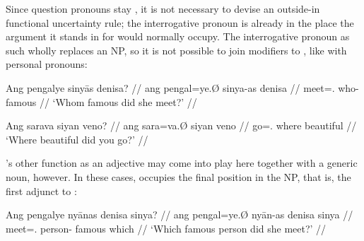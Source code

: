Since question pronouns stay , it is not necessary to devise an
outside-in functional uncertainty rule; the interrogative pronoun is already in
the place the argument it stands in for would normally occupy. The
interrogative pronoun as such wholly replaces an NP, so it is not possible to
join modifiers to , like with personal pronouns:

\pex
\a\ljudge*\begingl
	\gla Ang pengalye sinyās denisa? //
	\glb ang pengal=ye.Ø sinya-as denisa //
	\glc \AgtT{} meet=\TsgF{}.\Top{} who-\Parg{} famous //
	\glft `Whom famous did she meet?' //
\endgl

\a\ljudge*\begingl
	\gla Ang sarava siyan veno? //
	\glb ang sara=va.Ø siyan veno //
	\glc \Aarg{} go=\Second{}.\Top{} where beautiful //
	\glft `Where beautiful did you go?' //
\endgl
\xe

's other function as an adjective may come into play here
together with a generic noun, however. In these cases, 
occupies the final position in the NP, that is, the first adjunct to :

\pex
\a\label{ex:sinyaadj1}\begingl
	\gla Ang pengalye nyānas denisa sinya? //
	\glb ang pengal=ye.Ø nyān-as denisa sinya //
	\glc \AgtT{} meet=\TsgF{}.\Top{} person-\Parg{} famous which //
	\glft `Which famous person did she meet?' //
\endgl \medskip

